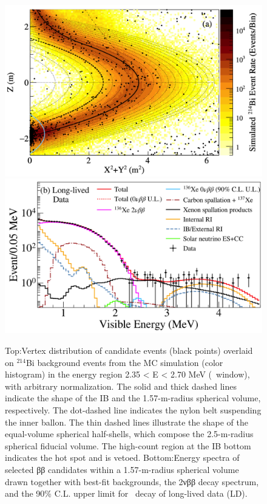 \begin{figure}[t!]
\begin{center}
\includegraphics[scale=0.25]{img/KL_fidutial}
\includegraphics[scale=0.25]{img/KL_LD_events}
\end{center}
\caption{Top:Vertex distribution of candidate events (black points) overlaid on $^{214}$Bi background events from the MC simulation (color histogram) in the energy region 2.35 < E < 2.70 MeV (\bbonu\ window), with arbitrary normalization. The solid and thick dashed lines indicate the shape of the IB and the 1.57-m-radius spherical volume, respectively. The dot-dashed line indicates the nylon belt suspending the inner ballon. The thin dashed lines illustrate the shape of the equal-volume spherical half-shells, which compose the 2.5-m-radius spherical fiducial volume. The high-count region at the IB bottom indicates the hot spot and is vetoed.
Bottom:Energy spectra of selected ββ candidates within a 1.57-m-radius spherical volume drawn together with best-fit backgrounds, the 2νββ decay spectrum, and the 90\% C.L. upper limit for \bbonu\ decay of  long-lived data (LD).
} \label{fig:kamlandzen}
\end{figure}


